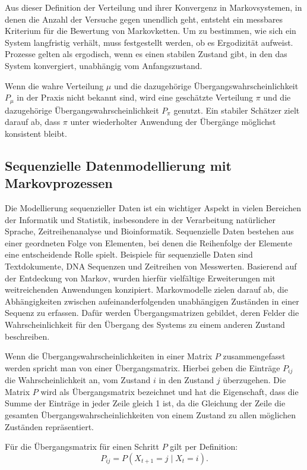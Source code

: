 Aus dieser Definition der Verteilung und ihrer Konvergenz in Markovsystemen, in denen die Anzahl der Versuche gegen unendlich geht, entsteht ein messbares Kriterium für die Bewertung von Markovketten. Um zu bestimmen, wie sich ein System langfristig verhält, muss festgestellt werden, ob es Ergodizität aufweist. Prozesse gelten als ergodisch, wenn es einen stabilen Zustand gibt, in den das System konvergiert, unabhängig vom Anfangszustand. \cite{MeynTweedie1993}

Wenn die wahre Verteilung $\mu$ und die dazugehörige Übergangswahrscheinlichkeit $P_\mu$ in der Praxis nicht bekannt sind, wird eine geschätzte Verteilung $\pi$ und die dazugehörige Übergangswahrscheinlichkeit $P_\pi$ genutzt. Ein stabiler Schätzer zielt darauf ab, dass $\pi$ unter wiederholter Anwendung der Übergänge möglichst konsistent bleibt.


\subsection{Sequenzielle Datenmodellierung mit Markovprozessen}

Die Modellierung sequenzieller Daten ist ein wichtiger Aspekt in vielen Bereichen der Informatik und Statistik, insbesondere in der Verarbeitung natürlicher Sprache, Zeitreihenanalyse und Bioinformatik. Sequenzielle Daten bestehen aus einer geordneten Folge von Elementen, bei denen die Reihenfolge der Elemente eine entscheidende Rolle spielt. Beispiele für sequenzielle Daten sind Textdokumente, DNA Sequenzen und Zeitreihen von Messwerten.
Basierend auf der Entdeckung von Markov, wurden hierfür vielfältige Erweiterungen mit weitreichenden Anwendungen konzipiert.
Markovmodelle zielen darauf ab, die Abhängigkeiten zwischen aufeinanderfolgenden unabhängigen Zuständen in einer Sequenz zu erfassen.
Dafür werden Übergangsmatrizen gebildet, deren Felder die Wahrscheinlichkeit für den Übergang des Systems zu einem anderen Zustand beschreiben.

Wenn die Übergangswahrscheinlichkeiten in einer Matrix $P$ zusammengefasst werden spricht man von einer Übergangsmatrix. Hierbei geben die Einträge $P_{ij}$ die Wahrscheinlichkeit an, vom Zustand $i$ in den Zustand $j$ überzugehen. Die Matrix $P$ wird als Übergangsmatrix bezeichnet und hat die Eigenschaft, dass die Summe der Einträge in jeder Zeile gleich 1 ist, da die Gleichung der Zeile die gesamten Übergangswahrscheinlichkeiten von einem Zustand zu allen möglichen Zuständen repräsentiert.

Für die Übergangsmatrix für einen Schritt $P$ gilt per Definition:
\begin{equation}
P_{ij} = P(X_{t+1} = j \mid X_t = i).
\end{equation}

